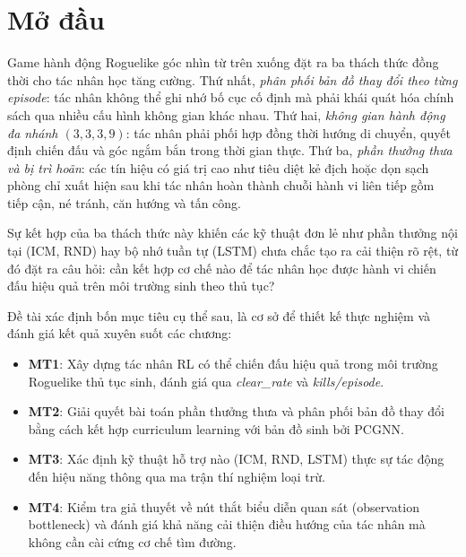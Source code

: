 \clearpage
{}

\chapter*{Mở đầu}


Game hành động Roguelike góc nhìn từ trên xuống đặt ra ba thách thức đồng thời cho tác nhân học tăng cường. Thứ nhất, \textit{phân phối bản đồ thay đổi theo từng episode}: tác nhân không thể ghi nhớ bố cục cố định mà phải khái quát hóa chính sách qua nhiều cấu hình không gian khác nhau. Thứ hai, \textit{không gian hành động đa nhánh $(3,3,3,9)$}: tác nhân phải phối hợp đồng thời hướng di chuyển, quyết định chiến đấu và góc ngắm bắn trong thời gian thực. Thứ ba, \textit{phần thưởng thưa và bị trì hoãn}: các tín hiệu có giá trị cao như tiêu diệt kẻ địch hoặc dọn sạch phòng chỉ xuất hiện sau khi tác nhân hoàn thành chuỗi hành vi liên tiếp gồm tiếp cận, né tránh, căn hướng và tấn công.

Sự kết hợp của ba thách thức này khiến các kỹ thuật đơn lẻ như phần thưởng nội tại (ICM, RND) hay bộ nhớ tuần tự (LSTM) chưa chắc tạo ra cải thiện rõ rệt, từ đó đặt ra câu hỏi: cần kết hợp cơ chế nào để tác nhân học được hành vi chiến đấu hiệu quả trên môi trường sinh theo thủ tục?

\vspace{0.5cm}

Đề tài xác định bốn mục tiêu cụ thể sau, là cơ sở để thiết kế thực nghiệm và đánh giá kết quả xuyên suốt các chương:

\renewcommand{\labelitemi}{$-$}
\begin{itemize}
    \item \textbf{MT1}: Xây dựng tác nhân RL có thể chiến đấu hiệu quả trong môi trường Roguelike thủ tục sinh, đánh giá qua \textit{clear\_rate} và \textit{kills/episode}.
    \item \textbf{MT2}: Giải quyết bài toán phần thưởng thưa và phân phối bản đồ thay đổi bằng cách kết hợp curriculum learning với bản đồ sinh bởi PCGNN.
    \item \textbf{MT3}: Xác định kỹ thuật hỗ trợ nào (ICM, RND, LSTM) thực sự tác động đến hiệu năng thông qua ma trận thí nghiệm loại trừ.
    \item \textbf{MT4}: Kiểm tra giả thuyết về nút thắt biểu diễn quan sát (observation bottleneck) và đánh giá khả năng cải thiện điều hướng của tác nhân mà không cần cài cứng cơ chế tìm đường.
\end{itemize}

